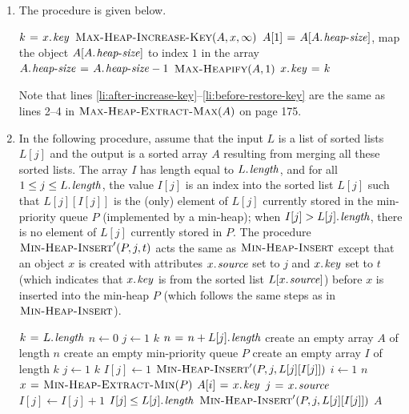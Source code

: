 \begin{enumerate}[\thesection-1]
\begin{codebox}
\li \If $\proc{Max-PQ-Stack-Empty}(P) \isequal \const{true}$
\li \Then
          \Error ``underflow''
    \End
\li \Return $\proc{Extract-Max}(P)$
\end{codebox}
If the max-priority queue $P$ is implemented by a max-heap, then the running times of the three procedures are $\bigtheta{1}$, $\bigtheta{\lg n}$ and $\bigtheta{\lg n}$, respectively.
%
\item The procedure is given below.
\begin{codebox}
\li $k \gets \attrib{x}{key}$
\li $\textnormal{\scshape Max-Heap-Increase-Key}(A, x, \infty)$ 
\li $A[1] \gets A[\attrib{A}{heap-size}]$, map the object $A[\attrib{A}{heap-size}]$ to index $1$ in the array \label{li:after-increase-key}
\li $\attrib{A}{heap-size} \gets \attrib{A}{heap-size} - 1$
\li $\textnormal{\scshape Max-Heapify}(A, 1)$ \label{li:before-restore-key}
\li $\attrib{x}{key} \gets k$
\end{codebox}
Note that lines \ref{li:after-increase-key}--\ref{li:before-restore-key} are the same as lines 2--4 in $\textnormal{\scshape Max-Heap-Extract-Max}(A)$ on page 175.
%
\item In the following procedure, assume that the input $L$ is a list of sorted lists $L[j]$ and the output is a sorted array $A$ resulting from merging all these sorted lists. The array $I$ has length equal to $\attrib{L}{length}$, and for all $1 \leq j \leq \attrib{L}{length}$, the value $I[j]$ is an index into the sorted list $L[j]$ such that $L[j][I[j]]$ is the (only) element of $L[j]$ currently stored in the min-priority queue $P$ (implemented by a min-heap); when $I[j] > \attrib{L[j]}{length}$, there is no element of $L[j]$ currently stored in $P$. The procedure $\textnormal{\scshape Min-Heap-Insert}'(P, j, t)$ acts the same as $\textnormal{\scshape Min-Heap-Insert}$ except that an object $x$ is created with attributes $\attrib{x}{source}$ set to $j$ and $\attrib{x}{key}$ set to $t$ (which indicates that $\attrib{x}{key}$ is from the sorted list $L[\attrib{x}{source}]$) before $x$ is inserted into the min-heap $P$ (which follows the same steps as in $\textnormal{\scshape Min-Heap-Insert}$).
\begin{codebox}
\li $k \gets \attrib{L}{length}$
\li $n \gets 0$
\li \For $j \gets 1$ \To $k$
\li \Do
         $n \gets n + \attrib{L[j]}{length}$
    \End
\li create an empty array $A$ of length $n$
\li create an empty min-priority queue $P$ 
\li create an empty array $I$ of length $k$
\li \For $j \gets 1$ \To $k$
\li \Do
         $I[j] \gets 1$
\li      $\textnormal{\scshape Min-Heap-Insert}'(P, j, L[j][I[j]])$
    \End
\li \For $i \gets 1$ \To $n$
\li \Do  
         $x \mathrel{\hspace{1pt}=\hspace{1pt}} \textnormal{\scshape Min-Heap-Extract-Min}(P)$
\li      $A[i] \gets \attrib{x}{key}$
\li      $j \gets \attrib{x}{source}$
\li      $I[j] \gets I[j] + 1$
\li      \If $I[j] \leq \attrib{L[j]}{length}$
\li      \Do
              $\textnormal{\scshape Min-Heap-Insert}'(P, j, L[j][I[j]])$
         \End
    \End
\li \Return $A$
\end{codebox}
%
\end{enumerate}
